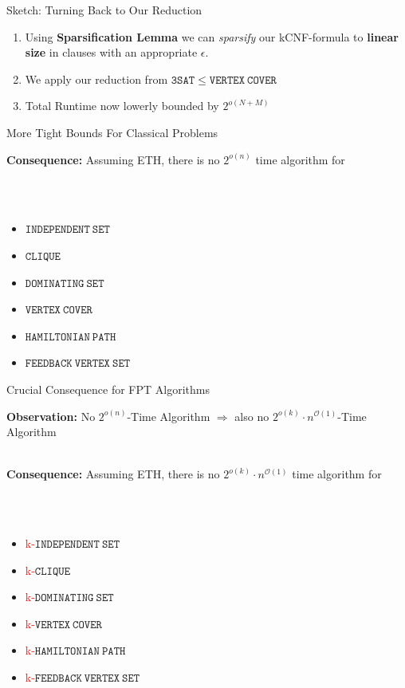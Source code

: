 \begin{frame}[c]{Sketch: Turning Back to Our Reduction}
\begin{enumerate}
    \item Using \textbf{Sparsification Lemma} we can \textit{sparsify} our kCNF-formula to \textbf{linear size} in clauses with an appropriate $\epsilon$.
    \item We apply our reduction from $\mathtt{3SAT} \leq \mathtt{VERTEX~COVER}$
    \item Total Runtime now lowerly bounded by $2^{o(N + M)}$  
\end{enumerate}
\end{frame}

\begin{frame}[c]{More Tight Bounds For Classical Problems}

\textbf{Consequence: } Assuming ETH, there is no $2^{o(n)}$ time algorithm for

\\~
\begin{center}

\begin{itemize}
    \item $\mathtt{INDEPENDENT~SET}$
    \item $\mathtt{CLIQUE}$
    \item $\mathtt{DOMINATING~SET}$
    \item $\mathtt{VERTEX~COVER}$
    \item $\mathtt{HAMILTONIAN~PATH}$
    \item $\mathtt{FEEDBACK~VERTEX~SET}$
\end{itemize}

\end{center}
\end{frame}
\begin{frame}[c]{Crucial Consequence for FPT Algorithms}

\textbf{Observation: } No $2^{o(n)}$-Time Algorithm $\Rightarrow$ also no $2^{o(k)} \cdot n^{\mathcal{O}(1)}$-Time Algorithm
\\~

\textbf{Consequence: } Assuming ETH, there is no $2^{o(k)} \cdot n^{\mathcal{O}(1)}$ time algorithm for

\\~
\begin{center}

\begin{itemize}
    \item \textcolor{red}{k-}$\mathtt{INDEPENDENT~SET}$
    \item \textcolor{red}{k-}$\mathtt{CLIQUE}$
    \item \textcolor{red}{k-}$\mathtt{DOMINATING~SET}$
    \item \textcolor{red}{k-}$\mathtt{VERTEX~COVER}$
    \item \textcolor{red}{k-}$\mathtt{HAMILTONIAN~PATH}$
    \item \textcolor{red}{k-}$\mathtt{FEEDBACK~VERTEX~SET}$
\end{itemize}

\end{center}
\end{frame}


